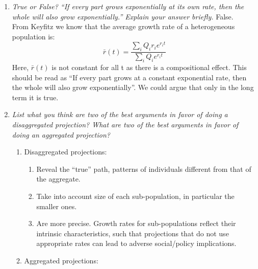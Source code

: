 \documentclass[]{book}
\providecommand{\tightlist}{%
  \setlength{\itemsep}{0pt}\setlength{\parskip}{0pt}}
\begin{document}
\begin{enumerate}
\def\labelenumi{\arabic{enumi}.}
\item
  \emph{True or False? ``If every part grows exponentially at its own rate, then the whole will also grow exponentially.'' Explain your answer briefly.}
  False.\\
  From Keyfitz we know that the average growth rate of a heterogeneous population is: \[\bar{r}(t)=\frac{\sum_i{Q_i}{r_i}e^{r_i{t}}}{\sum_i{Q_i}e^{r_i{t}}}\] Here, \(\bar{r}(t)\) is not constant for all t as there is a compositional effect. This should be read as ``If every part grows at a constant exponential rate, then the whole will also grow exponentially''. We could argue that only in the long term it is true.
\item
  \emph{List what you think are two of the best arguments in favor of doing a disaggregated projection? What are two of the best arguments in favor of doing an aggregated projection?}

  \begin{enumerate}
  \def\labelenumii{\alph{enumii}.}
  \tightlist
  \item
    Disaggregated projections:

    \begin{enumerate}
    \def\labelenumiii{\roman{enumiii}.}
    \tightlist
    \item
      Reveal the ``true'' path, patterns of individuals different from that of the aggregate.\\
    \item
      Take into account size of each sub-population, in particular the smaller ones.\\
    \item
      Are more precise. Growth rates for sub-populations reflect their intrinsic characteristics, such that projections that do not use appropriate rates can lead to adverse social/policy implications.\\
    \end{enumerate}
  \item
    Aggregated projections:


\end{enumerate}
\end{enumerate}
\end{document}
